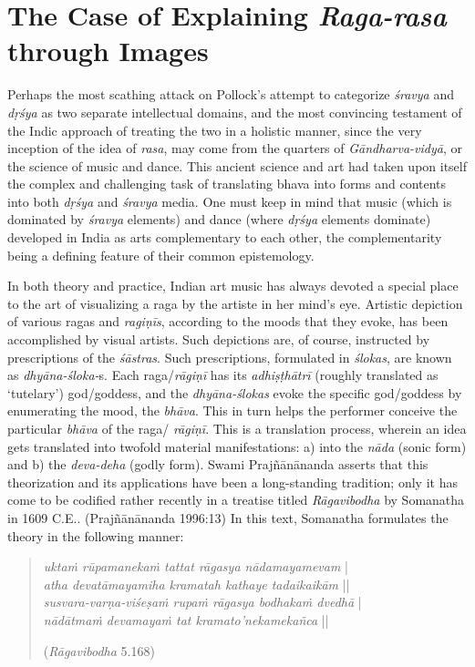 \section*{The Case of Explaining \textsl{Raga-rasa} through Images}

Perhaps the most scathing attack on Pollock’s attempt to categorize \textsl{śravya} and \textsl{dṛśya} as two separate intellectual domains, and the most convincing testament of the Indic approach of treating the two in a holistic manner, since the very inception of the idea of \textsl{rasa}, may come from the quarters of \textsl{Gāndharva-vidyā}, or the science of music and dance. This ancient science and art had taken upon itself the complex and challenging task of translating bhava into forms and contents into both \textsl{dṛśya} and \textsl{śravya} media. One must keep in mind that music (which is dominated by \textsl{śravya} elements) and dance (where \textsl{dṛśya} elements dominate) developed in India as arts complementary to each other, the complementarity being a defining feature of their common epistemology. 

In both theory and practice, Indian art music has always devoted a special place to the art of visualizing a raga by the artiste in her mind’s eye. Artistic depiction of various ragas and \textsl{ragiṇīs}, according to the moods that they evoke, has been accomplished by visual artists. Such depictions are, of course, instructed by prescriptions of the \textsl{śāstras}. Such prescriptions, formulated in \textsl{ślokas}, are known as \textsl{dhyāna-śloka-}s. Each raga/\textsl{rāgiṇī} has its \textsl{adhiṣṭhātrī} (roughly translated as ‘tutelary’) god/goddess, and the \textsl{dhyāna-ślokas} evoke the specific god/goddess by enumerating the mood, the \textsl{bhāva}. This in turn helps the performer conceive the particular \textsl{bhāva} of the raga/ \textsl{rāgiṇī}. This is a translation process, wherein an idea gets translated into twofold material manifestations: a) into the \textsl{nāda} (sonic form) and b) the \textsl{deva-deha} (godly form). Swami Prajñānānanda asserts that this theorization and its applications have been a long-standing tradition; only it has come to be codified rather recently in a treatise titled \textsl{Rāgavibodha} by Somanatha in 1609 C.E.. (Prajñānānanda 1996:13) In this text, Somanatha formulates the theory in the following manner:

\newpage

\begin{quote}
\textsl{uktaṁ rūpamanekaṁ tattat rāgasya nādamayamevam} |\\
\textsl{atha devatāmayamiha kramatah kathaye tadaikaikām} ||\\
\textsl{susvara-varṇa-viśeṣaṁ rupaṁ rāgasya bodhakaṁ dvedhā} |\\
\textsl{nādātmaṁ devamayaṁ tat kramato’nekamekañca} || 

\hfill (\textsl{Rāgavibodha} 5.168)
\end{quote}

